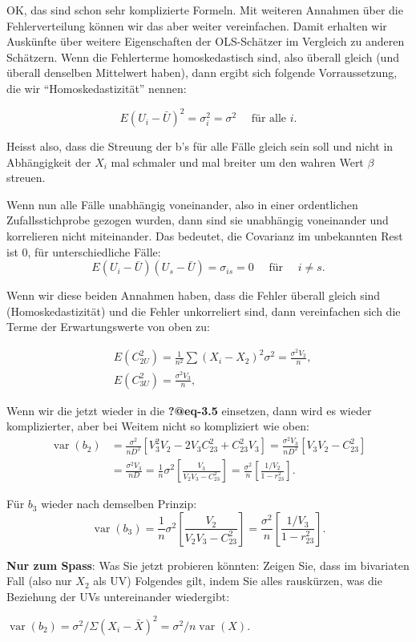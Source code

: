 \documentclass[
  10pt,
  letterpaper,
  a4paper, twoside]{scrreprt}
\begin{document}
\begin{tcolorbox}
OK, das sind schon sehr komplizierte Formeln. Mit weiteren Annahmen über
die Fehlerverteilung können wir das aber weiter vereinfachen. Damit
erhalten wir Auskünfte über weitere Eigenschaften der OLS-Schätzer im
Vergleich zu anderen Schätzern. Wenn die Fehlerterme homoskedastisch
sind, also überall gleich (und überall denselben Mittelwert haben), dann
ergibt sich folgende Vorraussetzung, die wir \enquote{Homoskedastizität}
nennen:

\[
E\left(U_i-\bar{U}\right)^2=\sigma_i^2=\sigma^2 \quad \text { für alle } i.
\]

Heisst also, dass die Streuung der b's für alle Fälle gleich sein soll
und nicht in Abhängigkeit der \(X_i\) mal schmaler und mal breiter um
den wahren Wert \(\beta\) streuen.

Wenn nun alle Fälle unabhängig voneinander, also in einer ordentlichen
Zufallsstichprobe gezogen wurden, dann sind sie unabhängig voneinander
und korrelieren nicht miteinander. Das bedeutet, die Covarianz im
unbekannten Rest ist 0, für unterschiedliche Fälle: \[
E\left(U_i-\bar{U}\right)\left(U_s-\bar{U}\right)=\sigma_{i s}=0 \quad \text { für } \quad i \neq s .
\]

Wenn wir diese beiden Annahmen haben, dass die Fehler überall gleich
sind (Homoskedastizität) und die Fehler unkorreliert sind, dann
vereinfachen sich die Terme der Erwartungswerte von oben zu:

\begin{align}
& E\left(C_{2 U}^2\right)=\frac{1}{n^2} \sum\left(X_i-X_2\right)^2 \sigma^2=\frac{\sigma^2 V_2}{n}, \\
& E\left(C_{3 U}^2\right)=\frac{\sigma^2 V_3}{n},
\end{align}

Wenn wir die jetzt wieder in die \textbf{?@eq-3.5} einsetzen, dann wird
es wieder komplizierter, aber bei Weitem nicht so kompliziert wie oben:
\begin{align}
\operatorname{var}\left(b_2\right) & =\frac{\sigma^2}{n D^2}\left[V_3^2 V_2-2 V_3 C_{23}^2+C_{23}^2 V_3\right]=\frac{\sigma^2 V_3}{n D^2}\left[V_3 V_2-C_{23}^2\right] \\
& =\frac{\sigma^2 V_3}{n D}=\frac{1}{n} \sigma^2\left[\frac{V_3}{V_2 V_3-C_{23}^2}\right]=\frac{\sigma^2}{n}\left[\frac{1 / V_2}{1-r_{23}^2}\right] .
\end{align}

Für \(b_3\) wieder nach demselben Prinzip: \[
\operatorname{var}\left(b_3\right)=\frac{1}{n} \sigma^2\left[\frac{V_2}{V_2 V_3-C_{23}^2}\right]=\frac{\sigma^2}{n}\left[\frac{1 / V_3}{1-r_{23}^2}\right] .
\]

\textbf{Nur zum Spass}: Was Sie jetzt probieren könnten: Zeigen Sie,
dass im bivariaten Fall (also nur \(X_2\) als UV) Folgendes gilt, indem
Sie alles rauskürzen, was die Beziehung der UVs untereinander
wiedergibt:

\(\operatorname{var}\left(b_2\right)=\sigma^2 / \Sigma\left(X_i-\bar{X}\right)^2=\sigma^2 / n \operatorname{var}(X).\)

\end{tcolorbox}
\end{document}
